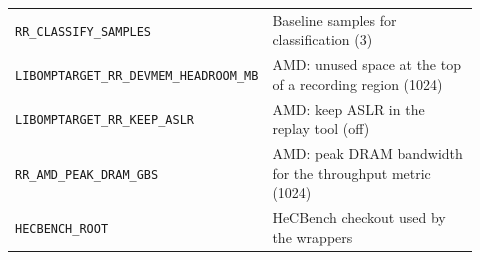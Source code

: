 \documentclass[10pt]{article}
\newcommand{\code}[1]{\texttt{#1}}
\begin{document}
\begin{table}[t]
\begin{tabular}{>{\raggedright\arraybackslash}p{0.42\linewidth}>{\raggedright\arraybackslash}p{0.5\linewidth}}
\code{RR\_CLASSIFY\_SAMPLES} & Baseline samples for classification (3) \\
\code{LIBOMPTARGET\_RR\_DEVMEM\_HEADROOM\_MB} & AMD: unused space at the top of a recording region (1024) \\
\code{LIBOMPTARGET\_RR\_KEEP\_ASLR} & AMD: keep ASLR in the replay tool (off) \\
\code{RR\_AMD\_PEAK\_DRAM\_GBS} & AMD: peak DRAM bandwidth for the throughput metric (1024) \\
\code{HECBENCH\_ROOT} & HeCBench checkout used by the wrappers \\
\bottomrule
\end{tabular}
\end{table}



\end{document}
